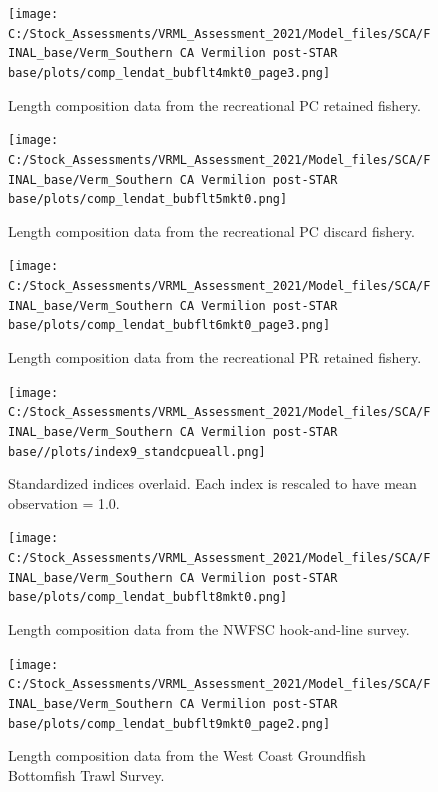 \documentclass[
  english,
  a4paper,
]{article}
\begin{document}
\begin{figure}
\centering
\texttt{[image: C:/Stock\_Assessments/VRML\_Assessment\_2021/Model\_files/SCA/FINAL\_base/Verm\_Southern CA Vermilion post-STAR base/plots/comp\_lendat\_bubflt4mkt0\_page3.png]}
\caption{Length composition data from the recreational PC retained fishery.\label{fig:len-data-REC-PC}}
\end{figure}

\begin{figure}
\centering
\texttt{[image: C:/Stock\_Assessments/VRML\_Assessment\_2021/Model\_files/SCA/FINAL\_base/Verm\_Southern CA Vermilion post-STAR base/plots/comp\_lendat\_bubflt5mkt0.png]}
\caption{Length composition data from the recreational PC discard fishery.\label{fig:len-data-REC-PC-DIS}}
\end{figure}

\begin{figure}
\centering
\texttt{[image: C:/Stock\_Assessments/VRML\_Assessment\_2021/Model\_files/SCA/FINAL\_base/Verm\_Southern CA Vermilion post-STAR base/plots/comp\_lendat\_bubflt6mkt0\_page3.png]}
\caption{Length composition data from the recreational PR retained fishery.\label{fig:len-data-REC-PR}}
\end{figure}

\begin{figure}
\centering
\texttt{[image: C:/Stock\_Assessments/VRML\_Assessment\_2021/Model\_files/SCA/FINAL\_base/Verm\_Southern CA Vermilion post-STAR base//plots/index9\_standcpueall.png]}
\caption{Standardized indices overlaid. Each index is rescaled to have mean observation = 1.0.\label{fig:cpueall}}
\end{figure}

\begin{figure}
\centering
\texttt{[image: C:/Stock\_Assessments/VRML\_Assessment\_2021/Model\_files/SCA/FINAL\_base/Verm\_Southern CA Vermilion post-STAR base/plots/comp\_lendat\_bubflt8mkt0.png]}
\caption{Length composition data from the NWFSC hook-and-line survey.\label{fig:len-data-NWFSC-HKL}}
\end{figure}

\begin{figure}
\centering
\texttt{[image: C:/Stock\_Assessments/VRML\_Assessment\_2021/Model\_files/SCA/FINAL\_base/Verm\_Southern CA Vermilion post-STAR base/plots/comp\_lendat\_bubflt9mkt0\_page2.png]}
\caption{Length composition data from the West Coast Groundfish Bottomfish Trawl Survey.\label{fig:len-data-NWFSC-TWL}}
\end{figure}
\end{document}
